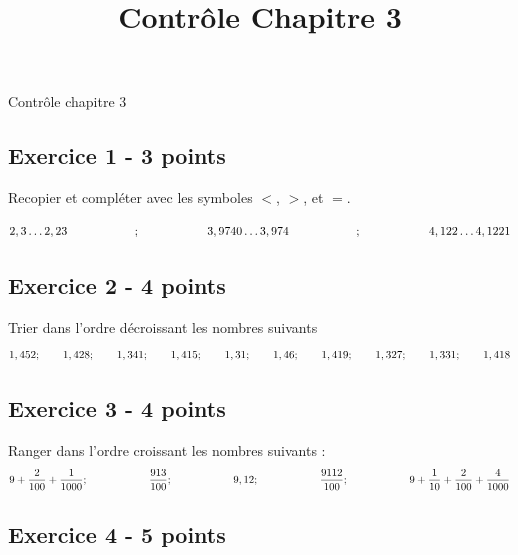 \documentclass[12 pt]{extarticle}
\title{Contrôle Chapitre 3}
\date{}
\theoremstyle{plain}
\begin{document}
\begin{center}{\Large Contrôle chapitre 3}\\ 
 \end{center}
 
 \subsection*{Exercice 1 - 3 points} 
 
 Recopier et compléter avec les symboles $<$, $>$, et $=$. 
 
 \[ 2,3 \ldots 2, 23 \hspace{2 cm}; \hspace{2 cm}
 3, 9740 \ldots 3, 974 \hspace{2 cm}; \hspace{2 cm}
 4,122 \ldots 4, 1221\]
 
 \subsection*{Exercice 2 - 4 points}
 Trier dans l'ordre décroissant les nombres suivants 
 \[ 
 1,452 ; \hspace{.7 cm}
1,428 ; \hspace{.7 cm}
 1,341   ; \hspace{.7 cm}
 1,415 ; \hspace{.7 cm}
1,31 ; \hspace{.7 cm}
1,46 ; \hspace{.7 cm}
1,419 ; \hspace{.7 cm}
1,327 ; \hspace{.7 cm}
1,331 ; \hspace{.7 cm}
1,418
 \]
 \subsection*{Exercice 3 - 4 points}
 
 Ranger dans l'ordre croissant les nombres suivants : 
 \[ 
 9 + \frac{2}{100} + \frac{1}{1000}; \hspace{2 cm}
 \frac{913}{100}; \hspace{2 cm}
 9,12    ; \hspace{2 cm}
 \frac{9112}{100} ; \hspace{2 cm}
 9 + \frac1{10} + \frac2{100} + \frac4{1000}
 \]
 
 \subsection*{Exercice 4 - 5 points}
 
\end{document}
